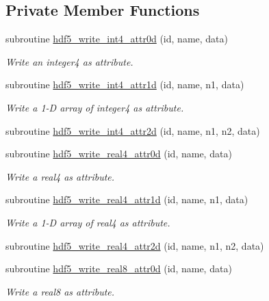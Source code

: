 \subsection*{Private Member Functions}
\begin{DoxyCompactItemize}
\item 
subroutine \hyperlink{interfacemodhdf5_1_1hdf5__write__attr_a3959ef2486c4c456e76584168da85aba}{hdf5\+\_\+write\+\_\+int4\+\_\+attr0d} (id, name, data)
\begin{DoxyCompactList}\small\item\em Write an integer4 as attribute. \end{DoxyCompactList}\item 
subroutine \hyperlink{interfacemodhdf5_1_1hdf5__write__attr_aa621d5efc77049d6ee8dab8b8a1e7ebe}{hdf5\+\_\+write\+\_\+int4\+\_\+attr1d} (id, name, n1, data)
\begin{DoxyCompactList}\small\item\em Write a 1-\/D array of integer4 as attribute. \end{DoxyCompactList}\item 
subroutine \hyperlink{interfacemodhdf5_1_1hdf5__write__attr_a38454d655e553e07bfaba67da14fd578}{hdf5\+\_\+write\+\_\+int4\+\_\+attr2d} (id, name, n1, n2, data)
\item 
subroutine \hyperlink{interfacemodhdf5_1_1hdf5__write__attr_adb6eff5c1284cf4fed9bd8a331a219fd}{hdf5\+\_\+write\+\_\+real4\+\_\+attr0d} (id, name, data)
\begin{DoxyCompactList}\small\item\em Write a real4 as attribute. \end{DoxyCompactList}\item 
subroutine \hyperlink{interfacemodhdf5_1_1hdf5__write__attr_a962f1050530d43822075bb646e631411}{hdf5\+\_\+write\+\_\+real4\+\_\+attr1d} (id, name, n1, data)
\begin{DoxyCompactList}\small\item\em Write a 1-\/D array of real4 as attribute. \end{DoxyCompactList}\item 
subroutine \hyperlink{interfacemodhdf5_1_1hdf5__write__attr_aae8bb567dcb75727d39619cfae14043f}{hdf5\+\_\+write\+\_\+real4\+\_\+attr2d} (id, name, n1, n2, data)
\item 
subroutine \hyperlink{interfacemodhdf5_1_1hdf5__write__attr_a867dca47b84260259e3a7fef99298dc8}{hdf5\+\_\+write\+\_\+real8\+\_\+attr0d} (id, name, data)
\begin{DoxyCompactList}\small\item\em Write a real8 as attribute. \end{DoxyCompactList}\item 

\end{DoxyCompactItemize}
